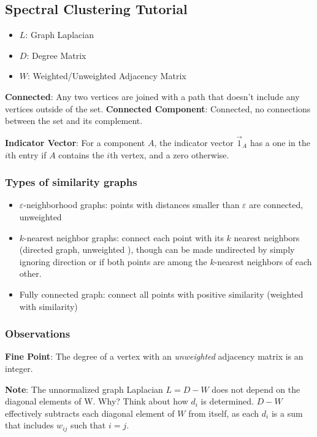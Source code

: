 \documentclass{article}
\begin{document}
        \subsection{Spectral Clustering Tutorial}   
        \begin{itemize}
            \item \textbf{\ensuremath{L}}: Graph Laplacian
            \item \textbf{\ensuremath{D}}: Degree Matrix
            \item \textbf{\ensuremath{W}}: Weighted/Unweighted Adjacency Matrix
        \end{itemize}
        \textbf{Connected}: Any two vertices are joined with a path that doesn't
include any vertices outside of the set.
        \textbf{Connected Component}: Connected, no connections between the set and
its complement. 

        \textbf{Indicator Vector}: For a component \ensuremath{A}, the indicator
vector \ensuremath{\vec{1}_{A}} has a one in the \ensuremath{i}th entry if
\ensuremath{A} contains the \ensuremath{i}th vertex, and a zero otherwise.
    
        \subsubsection{Types of similarity graphs}
        \begin{itemize}
        \item\ensuremath{\varepsilon}-neighborhood graphs: points with distances
smaller than \ensuremath{\varepsilon} are connected, unweighted
        \item\ensuremath{k}-nearest neighbor graphs: connect each point with its
\ensuremath{k} nearest neighbors (directed graph, unweighted ), though can be
made undirected by simply ignoring direction or if both points are among the
\ensuremath{k}-nearest neighbors of each other.
        \item Fully connected graph: connect all points with positive
similarity (weighted with similarity)
        \end{itemize}
        \subsubsection{Observations} 
        \textbf{Fine Point}: The degree of a vertex with an \emph{unweighted}
adjacency matrix is an integer. 

        \textbf{Note}: The unnormalized graph Laplacian
\ensuremath{L = D - W} does not depend on the diagonal elements of W. Why? Think
about how \ensuremath{d_{i}} is determined. \ensuremath{D - W} effectively
subtracts each diagonal element of \ensuremath{W} from itself, as each
\ensuremath{d_{i}} is a sum that includes \ensuremath{w_{ij}} such that
\ensuremath{i=j}.  
        
\end{document}
